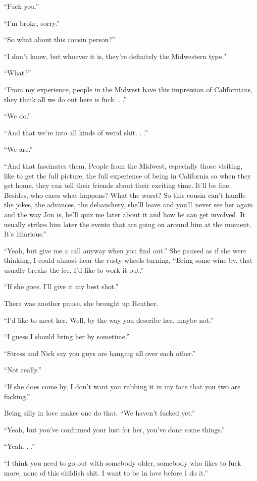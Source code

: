``Fuck you.''

``I'm broke, sorry.''

``So what about this cousin person?''

``I don't know, but whoever it is, they're definitely the Midwestern
type.''

``What?''

``From my experience, people in the Midwest have this impression of
Californians, they think all we do out here is fuck. . .''

``We do.''

``And that we're into all kinds of weird shit. . .''

``We are.''

``And that fascinates them. People from the Midwest, especially those
visiting, like to get the full picture, the full experience of being in
California so when they get home, they can tell their friends about
their exciting time. It'll be fine. Besides, who cares what happens?
What the worst? So this cousin can't handle the jokes, the advances, the
debauchery, she'll leave and you'll never see her again and the way Jon
is, he'll quiz me later about it and how he can get involved. It usually
strikes him later the events that are going on around him at the moment.
It's hilarious.''

``Yeah, but give me a call anyway when you find out.'' She paused as if
she were thinking, I could almost hear the rusty wheels turning. ``Bring
some wine by, that usually breaks the ice. I'd like to work it out.''

``If she goes. I'll give it my best shot.''

There was another pause, she brought up Heather.

``I'd like to meet her. Well, by the way you describe her, maybe not.''

``I guess I should bring her by sometime.''

``Stress and Nick say you guys are hanging all over each other.''

``Not really.''

``If she does come by, I don't want you rubbing it in my face that you
two are fucking.''

Being silly in love makes one do that. ``We haven't fucked yet.''

``Yeah, but you've confirmed your lust for her, you've done some
things.''

``Yeah. . .''

``I think you need to go out with somebody older, somebody who likes to
fuck more, none of this childish shit. I want to be in love before I do
it.''

